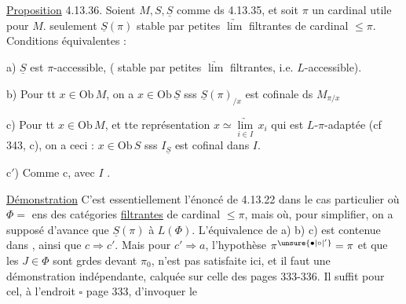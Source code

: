 \uline{Proposition} 4.13.36. Soient $M,S,\underline S$ comme ds 4.13.35, et soit $\pi$ un cardinal utile pour $M$.    seulement $\underline S(\pi)$  stable par petites $\underrightarrow{\lim}$ filtrantes  de cardinal $\leq\pi$. Conditions équivalentes :

a) $\underline S$ est $\pi$-accessible,   ( stable par petites $\underrightarrow{\lim}$ filtrantes, i.e. $L$-accessible).


b)  Pour tt $x\in\mathrm{Ob}\,M$, on a $x\in\mathrm{Ob}\,\underline S$ sss $\underline S(\pi)_{/x}$ est cofinale ds $M_{\pi/x}$

c)  Pour tt $x\in\mathrm{Ob}\,M$, et tte représentation $x\simeq\underset{i\in I}{\underrightarrow{\lim}}\,x_i$
qui est $L$-$\pi$-adaptée (cf  343, c), on a ceci : $x\in\mathrm{Ob}\,S$ sss $I_{\underline S}$ est cofinal dans $I$.

c$'$) Comme c, avec $I$ .


\uline{Démonstration} C'est essentiellement l'énoncé de 4.13.22 dans le cas particulier où $\Phi={}$ ens des catégories \uline{filtrantes} de cardinal $\leq\pi$, mais où, pour simplifier, on a supposé d'avance que $\underline S(\pi)$  à $L(\Phi)$. L'équivalence de a) b) c) est contenue dans , ainsi que $c\Longrightarrow c'$. Mais  pour $c'\Longrightarrow a$,  l'hypothèse  $\pi^{\unsure{\bullet|\circ|'}}=\pi$ et  que les $J\in\Phi$ sont grdes devant $\pi_0$, n'est pas satisfaite ici, et il faut une démonstration indépendante, calquée sur celle des  pages 333-336.  Il suffit pour cel, à l'endroit $\square$ page 333, d'invoquer le

